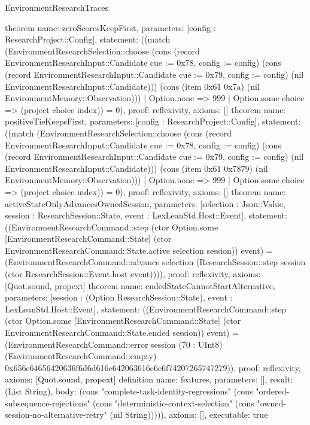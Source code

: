 \begin{lexlean}{EnvironmentResearchTraces}
\begin{semanticmodule}
{}
theorem{
 name: zeroScoresKeepFirst, parameters: [config : ResearchProject::Config],
 statement: ((match (EnvironmentResearchSelection::choose (cons (record EnvironmentResearchInput::Candidate {cue := 0x78, config := config}) (cons (record EnvironmentResearchInput::Candidate {cue := 0x79, config := config}) (nil EnvironmentResearchInput::Candidate))) (cons (item 0x61 0x7a) (nil EnvironmentMemory::Observation))) | Option.none => 999 | Option.some choice => (project choice index)) = 0), proof: reflexivity{}, axioms: []
}
theorem{
 name: positiveTieKeepsFirst, parameters: [config : ResearchProject::Config],
 statement: ((match (EnvironmentResearchSelection::choose (cons (record EnvironmentResearchInput::Candidate {cue := 0x78, config := config}) (cons (record EnvironmentResearchInput::Candidate {cue := 0x79, config := config}) (nil EnvironmentResearchInput::Candidate))) (cons (item 0x61 0x7879) (nil EnvironmentMemory::Observation))) | Option.none => 999 | Option.some choice => (project choice index)) = 0), proof: reflexivity{}, axioms: []
}
theorem{
 name: activeStateOnlyAdvancesOwnedSession, parameters: [selection : Json::Value, session : ResearchSession::State, event : LexLeanStd.Host::Event],
 statement: ((EnvironmentResearchCommand::step (ctor Option.some [EnvironmentResearchCommand::State] (ctor EnvironmentResearchCommand::State.active selection session)) event) = (EnvironmentResearchCommand::advance selection (ResearchSession::step session (ctor ResearchSession::Event.host event)))), proof: reflexivity{}, axioms: [Quot.sound, propext]
}
theorem{
 name: endedStateCannotStartAlternative, parameters: [session : (Option ResearchSession::State), event : LexLeanStd.Host::Event],
 statement: ((EnvironmentResearchCommand::step (ctor Option.some [EnvironmentResearchCommand::State] (ctor EnvironmentResearchCommand::State.ended session)) event) = (EnvironmentResearchCommand::error session (70 : UInt8) (EnvironmentResearchCommand::empty) 0x656e64656420636f6d6d616e642063616e6e6f74207265747279)), proof: reflexivity{}, axioms: [Quot.sound, propext]
}
definition{
 name: features, parameters: [], result: (List String),
 body: (cons "complete-task-identity-regressions" (cons "ordered-subsequence-rejections" (cons "deterministic-context-selection" (cons "owned-session-no-alternative-retry" (nil String))))),
 axioms: [], executable: true
}
\end{semanticmodule}
\end{lexlean}
